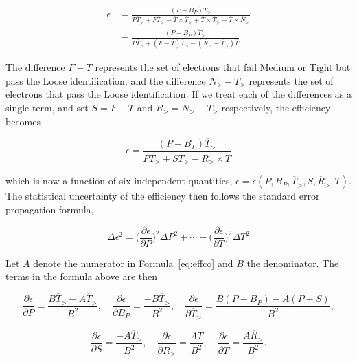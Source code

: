 \begin{equation*}
	\begin{split}
		\epsilon & = \frac{(P-B_P)\overline{T}_>}{P\overline{T}_> + F\overline{T}_> - \overline{T}\times \overline{T}_>
			+ \overline{T}\times \overline{T}_> - \overline{T}\times \overline{N}_>}  \\
		&  =  \frac{(P-B_P)\overline{T}_>}{P\overline{T}_> + (F - \overline{T})\overline{T}_>
			- (\overline{N}_> - \overline{T}_>)\overline{T}}
	\end{split}
\end{equation*}

The difference $F - \overline{T}$ represents the set of electrons that fail
Medium or Tight but pass the Loose identification, and the difference
$\overline{N}_> - \overline{T}_>$ represents the set of electrons that pass the
Loose identification. If we treat each of the differences as a single term, and
set $S = F - \overline{T}$ and $\overline{R}_> = \overline{N}_> -
	\overline{T}_>$ respectively, the efficiency becomes

\begin{equation}\label{eq:effco}
	\epsilon = \frac{(P-B_P)\overline{T}_>}{P\overline{T}_> + S\overline{T}_>
		- \overline{R}_>\times \overline{T}}
\end{equation}

which is now a function of six independent quantities, $\epsilon=\epsilon(P,
	B_P, \overline{T}_>, S, \overline{R}_>, T)$. The statistical uncertainty of the
efficiency then follows the standard error propagation formula,

\begin{equation}\label{eq:statprop}
	\Delta \epsilon^2 = \bigg(\frac{\partial \epsilon}{\partial P}\bigg)^2\Delta P^2 + \cdots +
	\bigg(\frac{\partial \epsilon}{\partial T}\bigg)^2\Delta T^2
\end{equation}


Let $A$ denote the numerator in Formula~\ref{eq:effco} and $B$ the denominator.
The terms in the formula above are then

$$\frac{\partial \epsilon}{\partial P} = \frac{B \overline{T}_> - A \overline{T}_> }{B^2},
	\quad
	\frac{\partial \epsilon}{\partial B_P} = \frac{- B \overline{T}_> }{B^2},
	\quad
	\frac{\partial \epsilon}{\partial \overline{T}_>} = \frac{B (P - B_P) - A(P + S) }{B^2},
$$

$$\frac{\partial \epsilon}{\partial S} = \frac{- A \overline{T}_> }{B^2},
	\quad
	\frac{\partial \epsilon}{\partial \overline{R}_>} = \frac{AT }{B^2},
	\quad
	\frac{\partial \epsilon}{\partial \overline{T}} = \frac{A \overline{R}_> }{B^2}.
$$

